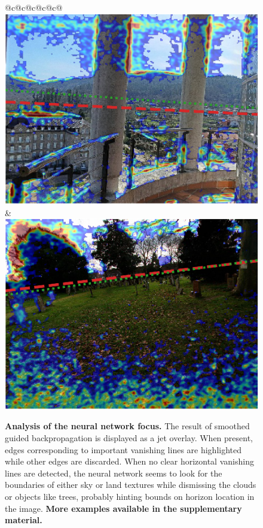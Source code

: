 \begin{figure}
\begin{tabular}{@{}c@{}c@{}c@{}c@{}c@{}}
\includegraphics[width=\sgbpwidth\linewidth]{figures/nn_analysis/sgbp/pano_addontedcyafqk_jpg-6.png} &
\includegraphics[width=\sgbpwidth\linewidth]{figures/nn_analysis/sgbp/pano_addhxkomphqrlr_jpg-4.png} \\
\end{tabular}
\egroup
\def\arraystretch{0.5} %
\caption[Analysis of the neural network focus]{\textbf{Analysis of the neural network focus.} The result of smoothed guided backpropagation is displayed as a jet overlay. When present, edges corresponding to important vanishing lines are highlighted while other edges are discarded. When no clear horizontal vanishing lines are detected, the neural network seems to look for the boundaries of either sky or land textures while dismissing the clouds or objects like trees, probably hinting bounds on horizon location in the image. \textbf{More examples available in the supplementary material.}}
\label{fig:nn_analysis_smoothed-guided-back-propagation}
\end{figure}

